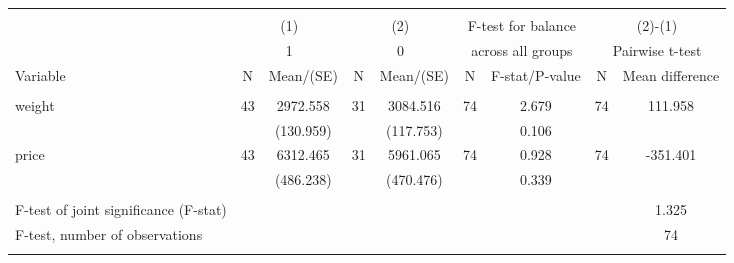 
\begin{tabular}{@{\extracolsep{5pt}}lcccccccc}
\\[-1.8ex]\hline \hline \\[-1.8ex]
 & \multicolumn{2}{c}{(1)}  & \multicolumn{2}{c}{(2)}  & \multicolumn{2}{c}{F-test for balance} & \multicolumn{2}{c}{(2)-(1)} \\
 & \multicolumn{2}{c}{1}  & \multicolumn{2}{c}{0}  & \multicolumn{2}{c}{across all groups} & \multicolumn{2}{c}{Pairwise t-test}  \\
Variable & N & Mean/(SE) & N & Mean/(SE) & N & F-stat/P-value & N & Mean difference \\ \hline \\[-1.8ex] 
weight   & 43    & 2972.558    & 31    & 3084.516    & 74    & 2.679    & 74    & 111.958   \\
 &   & (130.959)  &   & (117.753)  &   & 0.106  &   &  \\ [1ex]
price   & 43    & 6312.465    & 31    & 5961.065    & 74    & 0.928    & 74    & -351.401   \\
 &   & (486.238)  &   & (470.476)  &   & 0.339  &   &  \\ [1ex]
\hline \\[-1.8ex]
F-test of joint significance (F-stat) & &   & &   & &     & &  1.325  \\
F-test, number of observations & &   & &   & &   & &  74  \\
\hline \hline \\[-1.8ex]

\end{tabular}
